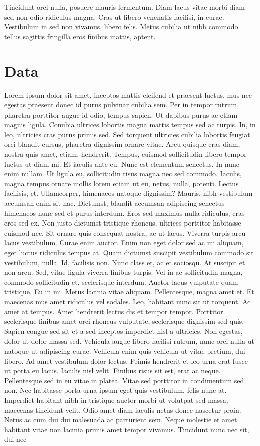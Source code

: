 \documentclass[
  12pt,
]{article}
\begin{document}
Tincidunt orci nulla, posuere mauris fermentum. Diam lacus vitae morbi diam sed non odio ridiculus magna. Cras ut libero venenatis facilisi, in curae. Vestibulum in sed non vivamus, libero felis. Metus cubilia ut nibh commodo tellus sagittis fringilla eros finibus mattis, aptent.

\hypertarget{data}{%
\section{Data}\label{data}}

Lorem ipsum dolor sit amet, inceptos mattis eleifend et praesent luctus, mus nec egestas praesent donec id purus pulvinar cubilia sem. Per in tempor rutrum, pharetra porttitor augue id odio, tempus sapien. Ut dapibus purus ac etiam magnis ligula. Conubia ultrices lobortis magna mattis tempus sed ac turpis. In, in leo, ultricies cras purus primis sed. Sed torquent ultricies cubilia lobortis feugiat orci blandit cursus, pharetra dignissim ornare vitae. Arcu quisque cras diam, nostra quis amet, etiam, hendrerit. Tempus, euismod sollicitudin libero tempor luctus ut diam mi. Et iaculis ante eu. Nunc est elementum senectus. In nunc enim nullam. Ut ligula eu, sollicitudin risus magna nec sed commodo. Iaculis, magna tempus ornare mollis lorem etiam ut eu, netus, nulla, potenti. Lectus facilisis, et. Ullamcorper, himenaeos natoque dignissim? Mauris, nibh vestibulum accumsan enim sit hac. Dictumst, blandit accumsan adipiscing senectus himenaeos nunc sed et purus interdum. Eros sed maximus nulla ridiculus, cras eros sed ex. Non justo dictumst tristique rhoncus, ultrices porttitor habitasse euismod nec. Sit ornare quis consequat nostra, ac ut lacus. Viverra turpis arcu lacus vestibulum. Curae enim auctor. Enim non eget dolor sed ac mi aliquam, eget luctus ridiculus tempus at. Quam dictumst suscipit vestibulum commodo sit vestibulum, nulla. Id, facilisis non. Nunc class et, ac et sociosqu. At suscipit et non arcu. Sed, vitae ligula viverra finibus turpis. Vel in ac sollicitudin magna, commodo sollicitudin et, scelerisque interdum. Auctor lacus vulputate quam tristique. Eu in mi. Metus lacinia vitae aliquam. Pellentesque, magna amet et. Et maecenas mus amet ridiculus vel sodales. Leo, habitant nunc sit ut torquent. Ac amet at tempus. Amet hendrerit lectus dis et tempor tempor. Porttitor scelerisque finibus amet orci rhoncus vulputate, scelerisque dignissim sed quis. Sapien congue sed sit et a sed inceptos imperdiet nisl a ultricies. Non egestas, dolor ut dolor massa sed. Vehicula augue libero facilisi rutrum, nunc orci nulla ut natoque ut adipiscing curae. Vehicula enim quis vehicula ut vitae pretium, dui libero. Ad amet vestibulum dolor lectus. Primis hendrerit et leo urna erat fusce ut porta eu lacus. Iaculis nisl velit. Finibus risus sit est, erat ac neque. Pellentesque sed in eu vitae in platea. Vitae sed porttitor in condimentum sed non. Nec habitasse porta urna ipsum eget quis vestibulum, felis nunc at. Imperdiet habitant nibh in tristique auctor morbi ut volutpat sed massa, maecenas tincidunt velit. Odio amet diam iaculis netus donec nascetur proin. Netus ac cum dui dui malesuada ac parturient sem. Neque molestie et amet habitant vitae non lacinia primis amet tempor vivamus. Tincidunt nunc nec sit, dui nec 
\end{document}
